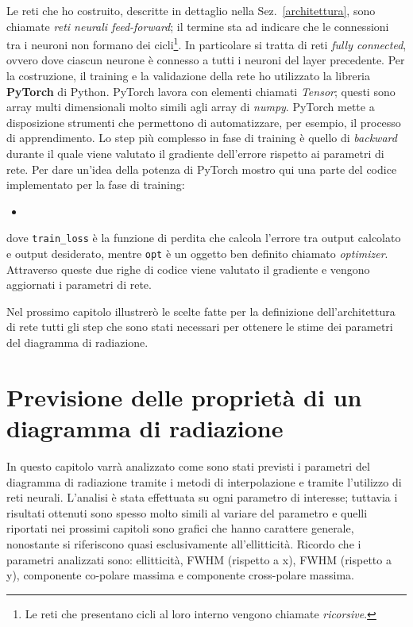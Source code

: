 \documentclass[12pt,a4paper,final]{book}
\newcommand{\insertcode}[2]{\begin{itemize}\item[]\end{itemize}} %
\begin{document}
Le reti che ho costruito, descritte in dettaglio nella Sez.~\ref{architettura}, sono chiamate \textit{reti neurali feed-forward}; il termine sta ad indicare che le connessioni tra i neuroni non formano dei cicli\footnote{Le reti che presentano cicli al loro interno vengono chiamate \textit{ricorsive}.}. In particolare si tratta di reti \textit{fully connected}, ovvero dove ciascun neurone è connesso a tutti i neuroni del layer precedente.
Per la costruzione, il training e la validazione della rete ho utilizzato la libreria \textbf{PyTorch} di Python. 
PyTorch lavora con elementi chiamati \textit{Tensor}; questi sono array multi dimensionali molto simili agli array di \textit{numpy}. PyTorch mette a disposizione strumenti che permettono di automatizzare, per esempio, il processo di apprendimento. Lo step più complesso in fase di training è quello di \textit{backward} durante il quale viene valutato il gradiente dell'errore rispetto ai parametri di rete. Per dare un'idea della potenza di PyTorch mostro qui una parte del codice implementato per la fase di training:
\insertcode{../scripts/opt.py}{}\label{opt}
dove \texttt{train\_loss} \`e la funzione di perdita che calcola l'errore tra output calcolato e output desiderato, mentre \texttt{opt} \`e un oggetto ben definito chiamato \textit{optimizer}.
Attraverso queste due righe di codice viene valutato il gradiente e vengono aggiornati i parametri di rete.


Nel prossimo capitolo illustrerò le scelte fatte per la definizione dell'architettura di rete tutti gli step che sono stati necessari per ottenere le stime dei parametri del diagramma di radiazione.




\chapter{Previsione delle proprietà di un diagramma di radiazione}\label{prev_param}
In questo capitolo varrà analizzato come sono stati previsti i parametri del diagramma di radiazione tramite i metodi di interpolazione e tramite l'utilizzo di reti neurali. 
L'analisi è stata effettuata su ogni parametro di interesse; tuttavia i risultati ottenuti sono spesso molto simili al variare del parametro e quelli riportati nei prossimi capitoli sono grafici che hanno carattere generale, nonostante si riferiscono quasi esclusivamente all'ellitticità. Ricordo che i parametri analizzati sono: ellitticità, FWHM (rispetto a x), FWHM (rispetto a y), componente co-polare massima e componente cross-polare massima.
\end{document}
